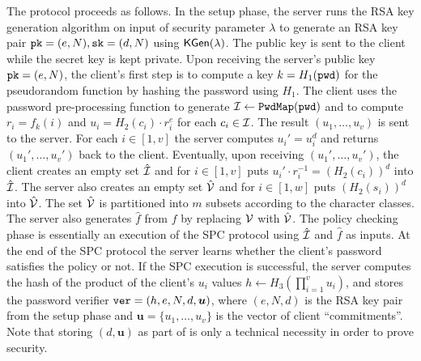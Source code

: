 The protocol proceeds as follows. 
In the setup phase, the server runs the RSA key generation algorithm on input of security parameter $\lambda$ to generate an RSA key pair $\mathtt{pk}=(e,N), \mathtt{sk}=(d,N)$ using $\mathsf{KGen}(\lambda)$. 
The public key is sent to the client while the secret key is kept private. 
Upon receiving the server's public key $\mathtt{pk}=(e,N)$, the client's first step is to compute a key $k=H_1(\mathtt{pwd})$ for the pseudorandom function by hashing the password using $H_1$. The client uses the password pre-processing function \PwdMap to generate $\mathcal{I}\gets\mathtt{PwdMap}(\mathtt{pwd})$ and to compute $r_i=f_k(i)$ and $u_i=H_2(c_i)\cdot r_i^e$ for each $c_i\in\mathcal{I}$.
The result $(u_1,\ldots,u_v)$ is sent to the server.
For each $i\in[1,v]$ the server computes $u_i'=u_i^d$ and returns $(u_1',\ldots,u_v')$ back to the client. 
Eventually, upon receiving $(u_1',\ldots,u_v')$, the client creates an empty set $\hat{\mathcal{I}}$ and for $i\in[1,v]$ puts $u_i'\cdot r_i^{-1}=(H_2(c_i))^d$ into $\hat{\mathcal{I}}$. 
The server also creates an empty set $\hat{\mathcal{V}}$ and for $i\in[1,w]$ puts $(H_2(s_i))^d$ into $\hat{\mathcal{V}}$. The set $\hat{\mathcal{V}}$ is partitioned into $m$ subsets according to the character classes. 
The server also generates $\hat{f}$ from $f$ by replacing $\mathcal{V}$ with $\hat{\mathcal{V}}$.
The policy checking phase is essentially an execution of  the \ac{SPC} protocol using $\hat{\mathcal{I}}$ and $\hat{f}$ as inputs. 
At the end of the \ac{SPC} protocol the server learns whether the client's password satisfies the policy or not. 
If the \ac{SPC} execution is successful, the server computes the hash of the product of the client's $u_i$ values $h\gets H_3(\prod_{i=1}^v u_i)$, and stores the password verifier $\mathtt{ver} = (h,e,N,d,\bm{u})$, where $(e,N,d)$ is the RSA key pair from the setup phase and $\bm{u}=\{u_1,\dots,u_v\}$ is the vector of client ``commitments''.
Note that storing $(d, \bm{u})$ as part of \ver is only a technical necessity in order to prove security.

